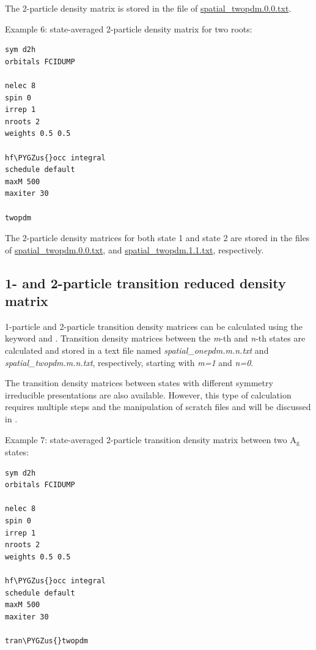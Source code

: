 \documentclass[letterpaper,10pt,english]{sphinxmanual}
\def\PYGZus{\char`\_}
\begin{document}
The 2-particle density matrix is stored in the file of \href{https://raw.githubusercontent.com/sanshar/Block/master/README\_Examples/5/spatial\_twopdm.0.0.txt}{spatial\_twopdm.0.0.txt}.

Example 6: state-averaged 2-particle density matrix for two roots:

\begin{Verbatim}[commandchars=\\\{\}]
sym d2h
orbitals FCIDUMP

nelec 8
spin 0
irrep 1
nroots 2
weights 0.5 0.5

hf\PYGZus{}occ integral
schedule default
maxM 500
maxiter 30

twopdm
\end{Verbatim}

The 2-particle density matrices for both state 1 and state 2 are stored in the files of
\href{https://raw.githubusercontent.com/sanshar/Block/master/README\_Examples/6/spatial\_twopdm.0.0.txt}{spatial\_twopdm.0.0.txt},
and \href{https://raw.githubusercontent.com/sanshar/Block/master/README\_Examples/6/spatial\_twopdm.1.1.txt}{spatial\_twopdm.1.1.txt}, respectively.


\subsection{1- and 2-particle transition reduced density matrix}
\label{examples:and-2-particle-transition-reduced-density-matrix}
1-particle and 2-particle transition density matrices can be calculated using the keyword  and .
Transition density matrices between the \emph{m}-th and \emph{n}-th states are calculated and stored in a text file named \emph{spatial\_onepdm.m.n.txt}
and \emph{spatial\_twopdm.m.n.txt}, respectively, starting with \emph{m=1} and \emph{n=0}.

The transition density matrices between states with different symmetry irreducible presentations are also available.
However, this type of calculation requires multiple steps and the manipulation of scratch files
and will be discussed in {\hyperref[examples:transition-dm]{\emph{}}}.

Example 7: state-averaged 2-particle transition density matrix between two A$_{\text{g}}$ states:

\begin{Verbatim}[commandchars=\\\{\}]
sym d2h
orbitals FCIDUMP

nelec 8
spin 0
irrep 1
nroots 2
weights 0.5 0.5

hf\PYGZus{}occ integral
schedule default
maxM 500
maxiter 30

tran\PYGZus{}twopdm
\end{Verbatim}
\end{document}
